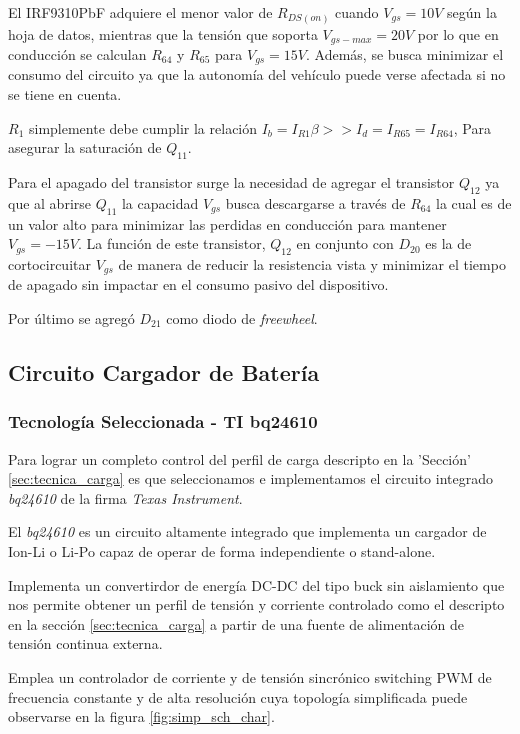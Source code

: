 \documentclass[10pt,a4paper]{article}
\begin{document}
\begin{itemize}
El IRF9310PbF adquiere el menor valor de $R_{DS(on)}$ cuando $V_{gs} = 10V$
según la hoja de datos\cite{IRF9310}, mientras que la tensión que soporta
$V_{gs-max}=20V$ por lo que en conducción se calculan $R_{64}$ y $R_{65}$ para
$V_{gs}=15V$.
Además, se busca minimizar el consumo del circuito ya que la autonomía del
vehículo puede verse afectada si no se tiene en cuenta.

$R_1$ simplemente debe cumplir la relación $I_b = I_{R1} \beta >> I_d = I_{R65}
= I_{R64}$, Para asegurar la saturación de $Q_{11}$. 

Para el apagado del transistor surge la necesidad de agregar el transistor
$Q_{12}$ ya que al abrirse $Q_{11}$ la capacidad $V_{gs}$ busca descargarse a
través de $R_{64}$ la cual es de un valor alto para minimizar las perdidas en
conducción para mantener $V_{gs}=-15V$. La función de este transistor, $Q_{12}$
en conjunto con $D_{20}$ es la de cortocircuitar $V_{gs}$ de manera de reducir
la resistencia vista y minimizar el tiempo de apagado sin impactar en el consumo
pasivo del dispositivo.

Por último se agregó $D_{21}$ como diodo de \emph{freewheel}.

\subsection{Circuito Cargador de Batería}

\subsubsection{Tecnología Seleccionada - TI bq24610}

Para lograr un completo control del perfil de carga descripto en la 'Sección'
\ref{sec:tecnica_carga}  es que seleccionamos e implementamos el circuito
integrado \emph{bq24610} de la firma \emph{Texas Instrument}.

El \emph{bq24610} es un circuito altamente integrado que implementa un cargador
de \acrfull{Ion-Li} o \acrfull{Li-Po} capaz de operar de forma independiente o
stand-alone.

Implementa un convertirdor de energía DC-DC del tipo buck sin aislamiento que
nos permite obtener un perfil de tensión y corriente controlado como el
descripto en la sección \ref{sec:tecnica_carga} a partir de una fuente de
alimentación de tensión continua externa.

Emplea un controlador de corriente y de tensión sincrónico
switching PWM de frecuencia constante y de alta resolución cuya
topología simplificada puede observarse en la figura \ref{fig:simp_sch_char}. 


\end{itemize}
\end{document}
